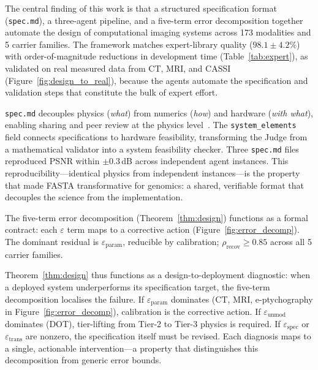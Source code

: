 \documentclass[11pt,a4paper]{article}
\newcommand{\eps}{\varepsilon}
\begin{document}
The central finding of this work is that a structured specification format (\texttt{spec.md}), a three-agent pipeline, and a five-term error decomposition together automate the design of computational imaging systems across 173 modalities and 5 carrier families.  The framework matches expert-library quality ($98.1\pm4.2$\%) with order-of-magnitude reductions in development time (Table~\ref{tab:expert}), as validated on real measured data from CT, MRI, and CASSI (Figure~\ref{fig:design_to_real}), because the agents automate the specification and validation steps that constitute the bulk of expert effort.

\texttt{spec.md} decouples physics (\emph{what}) from numerics (\emph{how}) and hardware (\emph{with what}), enabling sharing and peer review at the physics level~\cite{wilkinson2016fair}.  The \texttt{system\_elements} field connects specifications to hardware feasibility, transforming the Judge from a mathematical validator into a system feasibility checker.  Three \texttt{spec.md} files reproduced PSNR within $\pm 0.3$\,dB across independent agent instances.  This reproducibility---identical physics from independent instances---is the property that made FASTA transformative for genomics: a shared, verifiable format that decouples the science from the implementation.

The five-term error decomposition (Theorem~\ref{thm:design}) functions as a formal contract: each $\eps$ term maps to a corrective action (Figure~\ref{fig:error_decomp}).  The dominant residual is $\eps_{\text{param}}$, reducible by calibration; $\rho_{\text{recov}} \geq 0.85$ across all 5 carrier families.

Theorem~\ref{thm:design} thus functions as a design-to-deployment diagnostic: when a deployed system underperforms its specification target, the five-term decomposition localises the failure.  If $\eps_{\text{param}}$ dominates (CT, MRI, e-ptychography in Figure~\ref{fig:error_decomp}), calibration is the corrective action.  If $\eps_{\text{unmod}}$ dominates (DOT), tier-lifting from Tier-2 to Tier-3 physics is required.  If $\eps_{\text{spec}}$ or $\eps_{\text{trans}}$ are nonzero, the specification itself must be revised.  Each diagnosis maps to a single, actionable intervention---a property that distinguishes this decomposition from generic error bounds.
\end{document}
